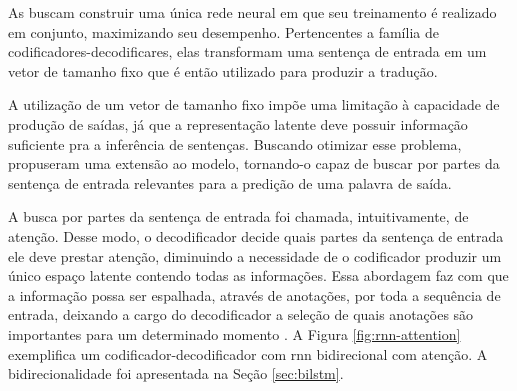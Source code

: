As  buscam construir uma única rede neural em que seu treinamento é realizado em conjunto, maximizando seu desempenho. Pertencentes a família de codificadores-decodificares, elas transformam uma sentença de entrada em um vetor de tamanho fixo que é então utilizado para produzir a tradução.

A utilização de um vetor de tamanho fixo impõe uma limitação à capacidade de produção de saídas, já que a representação latente deve possuir informação suficiente pra a inferência de sentenças. Buscando otimizar esse problema, \textcite{Bahdanau2016Neural} propuseram uma extensão ao modelo, tornando-o capaz de buscar por partes da sentença de entrada relevantes para a predição de uma palavra de saída.

A busca por partes da sentença de entrada foi chamada, intuitivamente, de atenção. Desse modo, o decodificador decide quais partes da sentença de entrada ele deve prestar atenção, diminuindo a necessidade de o codificador produzir um único espaço latente contendo todas as informações. Essa abordagem faz com que a informação possa ser espalhada, através de anotações, por toda a sequência de entrada, deixando a cargo do decodificador a seleção de quais anotações são importantes para um determinado momento \cite{Bahdanau2016Neural}. A Figura \ref{fig:rnn-attention} exemplifica um codificador-decodificador com \gls{rnn} bidirecional com atenção. A bidirecionalidade foi apresentada na Seção \ref{sec:bilstm}. 
